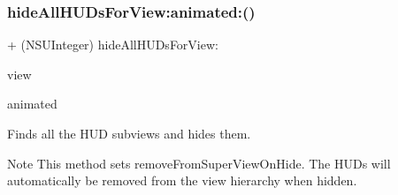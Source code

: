 \subsubsection{\texorpdfstring{hide\+All\+H\+U\+Ds\+For\+View\+:animated\+:()}{hideAllHUDsForView:animated:()}\hspace{0.1cm}{\footnotesize\ttfamily [1/3]}}
{\footnotesize\ttfamily + (N\+S\+U\+Integer) hide\+All\+H\+U\+Ds\+For\+View\+: \begin{DoxyParamCaption}\item[{(U\+I\+View $\ast$)}]{view }\item[{animated:(B\+O\+OL)}]{animated }\end{DoxyParamCaption}}

Finds all the H\+UD subviews and hides them.

\begin{DoxyNote}{Note}
This method sets {\ttfamily remove\+From\+Super\+View\+On\+Hide}. The H\+U\+Ds will automatically be removed from the view hierarchy when hidden.
\end{DoxyNote}

